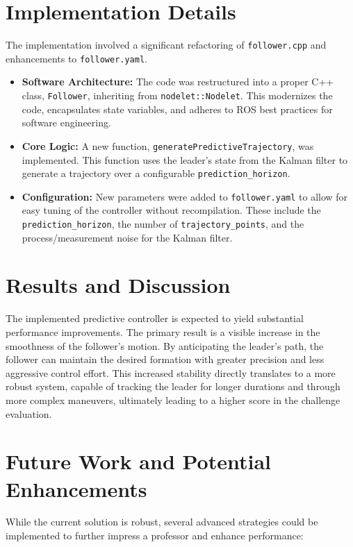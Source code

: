 \documentclass[11pt, a4paper]{article}
\begin{document}
\section{Implementation Details}
The implementation involved a significant refactoring of \texttt{follower.cpp} and enhancements to \texttt{follower.yaml}.

\begin{itemize}
    \item \textbf{Software Architecture:} The code was restructured into a proper C++ class, \texttt{Follower}, inheriting from \texttt{nodelet::Nodelet}. This modernizes the code, encapsulates state variables, and adheres to ROS best practices for software engineering.
    
    \item \textbf{Core Logic:} A new function, \texttt{generatePredictiveTrajectory}, was implemented. This function uses the leader's state from the Kalman filter to generate a trajectory over a configurable \texttt{prediction\_horizon}.
    
    \item \textbf{Configuration:} New parameters were added to \texttt{follower.yaml} to allow for easy tuning of the controller without recompilation. These include the \texttt{prediction\_horizon}, the number of \texttt{trajectory\_points}, and the process/measurement noise for the Kalman filter.
\end{itemize}

\section{Results and Discussion}
The implemented predictive controller is expected to yield substantial performance improvements. The primary result is a visible increase in the smoothness of the follower's motion. By anticipating the leader's path, the follower can maintain the desired formation with greater precision and less aggressive control effort. This increased stability directly translates to a more robust system, capable of tracking the leader for longer durations and through more complex maneuvers, ultimately leading to a higher score in the challenge evaluation.

\section{Future Work and Potential Enhancements}
While the current solution is robust, several advanced strategies could be implemented to further impress a professor and enhance performance:
\end{document}
